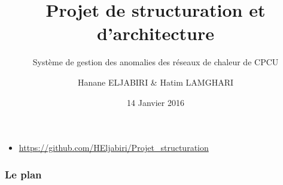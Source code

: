 \documentclass[t,french]{beamer}
\title{Projet de structuration et d'architecture}
\subtitle{Système de gestion des anomalies des réseaux de chaleur de CPCU}
\author{Hanane ELJABIRI \& Hatim LAMGHARI}
\institute{ENSG}
\date{14 Janvier 2016}
\begin{document}
\begin{frame}
\titlepage
\begin{itemize}
\item 	\url{https://github.com/HEljabiri/Projet_structuration}
\end{itemize}
\end{frame}

\begin{frame}
\frametitle{Le plan}
\tableofcontents
\end{frame}


\end{document}
